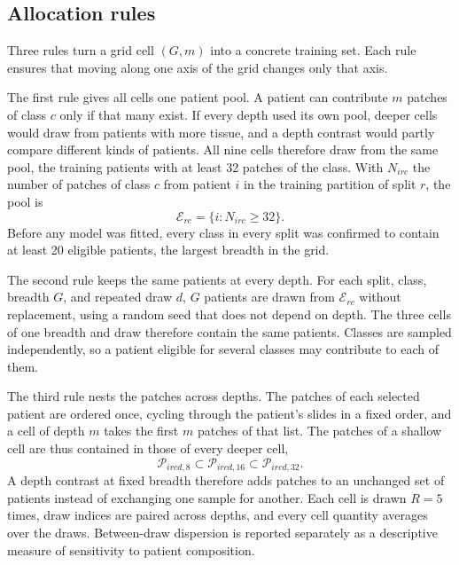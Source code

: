 \documentclass[11pt]{article}
\begin{document}
\subsection{Allocation rules}
\label{sec:allocation}
Three rules turn a grid cell $(G,m)$ into a concrete training set. Each rule ensures that moving along one axis of the grid changes only that axis.

The first rule gives all cells one patient pool. A patient can contribute $m$ patches of class $c$ only if that many exist. If every depth used its own pool, deeper cells would draw from patients with more tissue, and a depth contrast would partly compare different kinds of patients. All nine cells therefore draw from the same pool, the training patients with at least 32 patches of the class. With $N_{irc}$ the number of patches of class $c$ from patient $i$ in the training partition of split $r$, the pool is
\begin{equation}
\mathcal E_{rc}=\{i:N_{irc}\ge 32\}.
\end{equation}
\noindent Before any model was fitted, every class in every split was confirmed to contain at least 20 eligible patients, the largest breadth in the grid.

The second rule keeps the same patients at every depth. For each split, class, breadth $G$, and repeated draw $d$, $G$ patients are drawn from $\mathcal E_{rc}$ without replacement, using a random seed that does not depend on depth. The three cells of one breadth and draw therefore contain the same patients. Classes are sampled independently, so a patient eligible for several classes may contribute to each of them.

The third rule nests the patches across depths. The patches of each selected patient are ordered once, cycling through the patient's slides in a fixed order, and a cell of depth $m$ takes the first $m$ patches of that list. The patches of a shallow cell are thus contained in those of every deeper cell,
\begin{equation}
\mathcal P_{ircd,8}\subset\mathcal P_{ircd,16}\subset\mathcal P_{ircd,32}.
\end{equation}
\noindent A depth contrast at fixed breadth therefore adds patches to an unchanged set of patients instead of exchanging one sample for another. Each cell is drawn $R=5$ times, draw indices are paired across depths, and every cell quantity averages over the draws. Between-draw dispersion is reported separately as a descriptive measure of sensitivity to patient composition.
\end{document}
